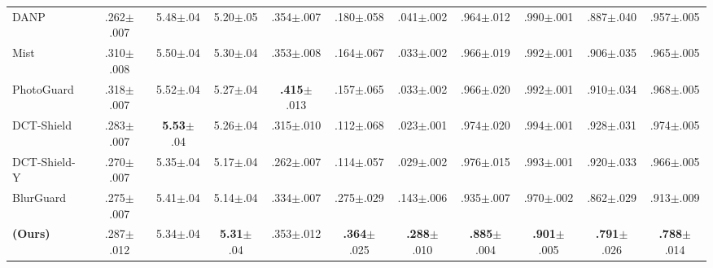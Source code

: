 \begin{table}[t]
\begin{tabular}{l ccc ccc cc cc}
    DANP & .262{\scriptsize$\pm$.007} & 5.48{\scriptsize$\pm$.04} & 5.20{\scriptsize$\pm$.05} & .354{\scriptsize$\pm$.007} & .180{\scriptsize$\pm$.058} & .041{\scriptsize$\pm$.002} & .964{\scriptsize$\pm$.012} & .990{\scriptsize$\pm$.001} & .887{\scriptsize$\pm$.040} & .957{\scriptsize$\pm$.005} \\
    Mist & .310{\scriptsize$\pm$.008} & 5.50{\scriptsize$\pm$.04} & 5.30{\scriptsize$\pm$.04} & .353{\scriptsize$\pm$.008} & .164{\scriptsize$\pm$.067} & .033{\scriptsize$\pm$.002} & .966{\scriptsize$\pm$.019} & .992{\scriptsize$\pm$.001} & .906{\scriptsize$\pm$.035} & .965{\scriptsize$\pm$.005} \\
    PhotoGuard & .318{\scriptsize$\pm$.007} & 5.52{\scriptsize$\pm$.04} & 5.27{\scriptsize$\pm$.04} & \textbf{.415}{\scriptsize$\pm$.013} & .157{\scriptsize$\pm$.065} & .033{\scriptsize$\pm$.002} & .966{\scriptsize$\pm$.020} & .992{\scriptsize$\pm$.001} & .910{\scriptsize$\pm$.034} & .968{\scriptsize$\pm$.005} \\
    DCT-Shield & .283{\scriptsize$\pm$.007} & \textbf{5.53}{\scriptsize$\pm$.04} & 5.26{\scriptsize$\pm$.04} & .315{\scriptsize$\pm$.010} & .112{\scriptsize$\pm$.068} & .023{\scriptsize$\pm$.001} & .974{\scriptsize$\pm$.020} & .994{\scriptsize$\pm$.001} & .928{\scriptsize$\pm$.031} & .974{\scriptsize$\pm$.005} \\
    DCT-Shield-Y & .270{\scriptsize$\pm$.007} & 5.35{\scriptsize$\pm$.04} & 5.17{\scriptsize$\pm$.04} & .262{\scriptsize$\pm$.007} & .114{\scriptsize$\pm$.057} & .029{\scriptsize$\pm$.002} & .976{\scriptsize$\pm$.015} & .993{\scriptsize$\pm$.001} & .920{\scriptsize$\pm$.033} & .966{\scriptsize$\pm$.005} \\
    BlurGuard & .275{\scriptsize$\pm$.007} & 5.41{\scriptsize$\pm$.04} & 5.14{\scriptsize$\pm$.04} & .334{\scriptsize$\pm$.007} & .275{\scriptsize$\pm$.029} & .143{\scriptsize$\pm$.006} & .935{\scriptsize$\pm$.007} & .970{\scriptsize$\pm$.002} & .862{\scriptsize$\pm$.029} & .913{\scriptsize$\pm$.009} \\
    \midrule
    \rowcolor{oursrow}
    \textbf{\capg{} (Ours)} & .287{\scriptsize$\pm$.012} & 5.34{\scriptsize$\pm$.04} & \textbf{5.31}{\scriptsize$\pm$.04} & .353{\scriptsize$\pm$.012} & \textbf{.364}{\scriptsize$\pm$.025} & \textbf{.288}{\scriptsize$\pm$.010} & \textbf{.885}{\scriptsize$\pm$.004} & \textbf{.901}{\scriptsize$\pm$.005} & \textbf{.791}{\scriptsize$\pm$.026} & \textbf{.788}{\scriptsize$\pm$.014} \\
    \bottomrule
  \end{tabular}
\end{table}
